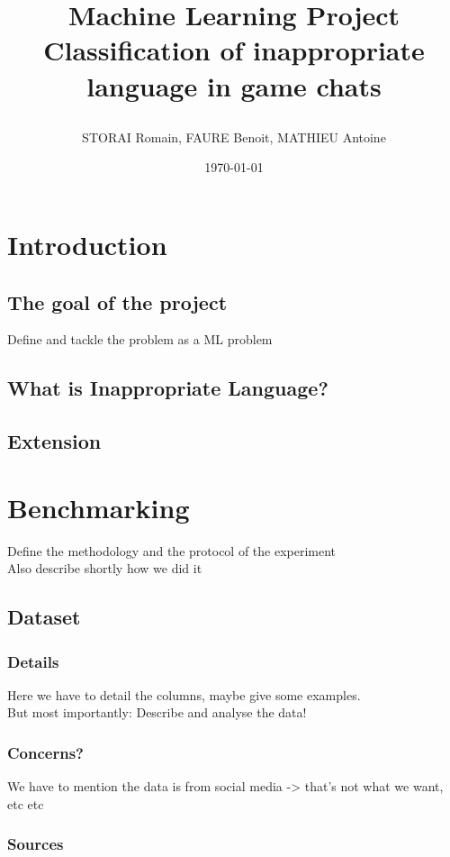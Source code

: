 \documentclass[11pt,a4paper]{article}
\title{%
    \begin{minipage}\linewidth
        \centering\bfseries\sffamily
        Machine Learning Project
        \vskip 3pt
        \large Classification of inappropriate language in game chats
    \end{minipage}
}
\author{ STORAI Romain, FAURE Benoit, MATHIEU Antoine }
\date{\today}
\begin{document}
\maketitle	

\tableofcontents
\pagebreak

\section{Introduction}

\subsection{The goal of the project}
Define and tackle the problem as a ML problem

\subsection{What is Inappropriate Language?}

\subsection{Extension}

\pagebreak
\section{Benchmarking}
Define the methodology and the protocol of the experiment\\
Also describe shortly how we did it

\subsection{Dataset}

\subsubsection{Details}

Here we have to detail the columns, maybe give some examples.\\But most importantly: Describe and analyse the data!

\subsubsection{Concerns?}
We have to mention the data is from social media -> that's not what we want, etc etc

\subsubsection{Sources}
\end{document}

